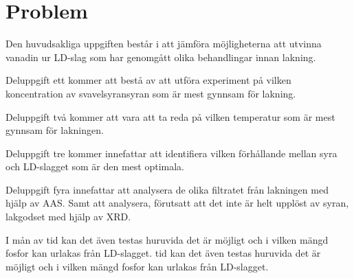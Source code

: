 \section{Problem}
Den huvudsakliga uppgiften består i att jämföra möjligheterna att utvinna vanadin ur LD-slag som har genomgått olika behandlingar innan lakning.


     

Deluppgift ett kommer att bestå av att utföra experiment på vilken koncentration av svavelsyransyran som är mest gynnsam för lakning. 

Deluppgift två kommer att vara att ta reda på vilken temperatur som är mest gynnsam för lakningen. 


Deluppgift tre kommer innefattar att identifiera vilken förhållande mellan syra och LD-slagget som är den mest optimala. 

Deluppgift fyra innefattar att analysera de olika filtratet från lakningen med hjälp av AAS. Samt att analysera, förutsatt att det inte är helt upplöst av syran, lakgodset med hjälp av XRD. %

I mån av tid kan det även testas huruvida det är möjligt och i vilken mängd fosfor kan urlakas från LD-slagget. 
tid kan det även testas huruvida det är möjligt och i vilken mängd fosfor kan urlakas från LD-slagget. 

